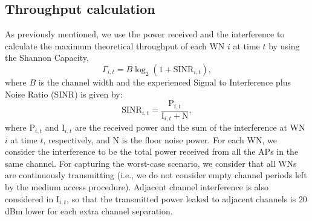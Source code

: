 \documentclass[10pt,journal,compsoc]{IEEEtran}
\begin{document}
	\subsection{Throughput calculation}
	\label{section:throughput_calculation}
	As previously mentioned, we use the power received and the interference to calculate the maximum theoretical throughput of each WN $i$ at time $t$ by using the Shannon Capacity,
	\begin{equation}
	\Gamma_{i,t} = B  \log_{2}(1 + \text{SINR}_{i, t}),
	\nonumber
	\label{eq:shannon_capacity}
	\end{equation}
	where $B$ is the channel width and the experienced Signal to Interference plus Noise Ratio (SINR) is given by:
	\begin{equation}
	\text{SINR}_{i,t} = \frac{\text{P}_{i,t}}{\text{I}_{i,t}+\text{N}},
	\label{eq:sinr}
	\nonumber
	\end{equation}
	where $\text{P}_{i,t}$ and $\text{I}_{i,t}$ are the received power and the sum of the interference at WN $i$ at time $t$, respectively, and N is the floor noise power. For each WN, we consider the interference to be the total power received from all the APs in the same channel. For capturing the worst-case scenario, we consider that all WNs are continuously transmitting (i.e., we do not consider empty channel periods left by the medium access procedure). Adjacent channel interference is also considered in $\text{I}_{i,t}$, so that the transmitted power leaked to adjacent channels is $20$ dBm lower for each extra channel separation.
	
\end{document}
